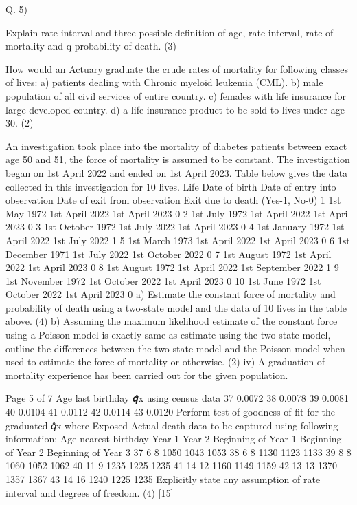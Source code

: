 Q. 5)
\item Explain rate interval and three possible definition of age, rate interval, \mu  rate of mortality and q probability of death.
(3)
\item How would an Actuary graduate the crude rates of mortality for following classes of lives:
a) patients dealing with Chronic myeloid leukemia (CML).
b) male population of all civil services of entire country.
c) females with life insurance for large developed country.
d) a life insurance product to be sold to lives under age 30.
(2)
\item An investigation took place into the mortality of diabetes patients between exact age 50 and 51, the force of mortality  is assumed to be constant.
The investigation began on 1st April 2022 and ended on 1st April 2023. Table below gives the data collected in this investigation for 10 lives.
Life
Date of birth
Date of entry into observation
Date of exit from observation
Exit due to death (Yes-1, No-0)
1
1st May 1972
1st April 2022
1st April 2023
0
2
1st July 1972
1st April 2022
1st April 2023
0
3
1st October 1972
1st July 2022
1st April 2023
0
4
1st January 1972
1st April 2022
1st July 2022
1
5
1st March 1973
1st April 2022
1st April 2023
0
6
1st December 1971
1st July 2022
1st October 2022
0
7
1st August 1972
1st April 2022
1st April 2023
0
8
1st August 1972
1st April 2022
1st September 2022
1
9
1st November 1972
1st October 2022
1st April 2023
0
10
1st June 1972
1st October 2022
1st April 2023
0
a) Estimate the constant force of mortality and probability of death using a two-state model and the data of 10 lives in the table above.
(4)
b) Assuming the maximum likelihood estimate of the constant force using a Poisson model is exactly same as estimate using the two-state model, outline the differences between the two-state model and the Poisson model when used to estimate the force of mortality or otherwise.
(2)
iv) A graduation of mortality experience has been carried out for the given population.

Page 5 of 7
Age last birthday
𝒒̂x using census data
37
0.0072
38
0.0078
39
0.0081
40
0.0104
41
0.0112
42
0.0114
43
0.0120
Perform test of goodness of fit for the graduated 𝑞̂x where Exposed Actual death data to be captured using following information:
Age nearest birthday
Year 1
Year 2
Beginning of Year 1
Beginning of Year 2
Beginning of Year 3
37
6
8
1050
1043
1053
38
6
8
1130
1123
1133
39
8
8
1060
1052
1062
40
11
9
1235
1225
1235
41
14
12
1160
1149
1159
42
13
13
1370
1357
1367
43
14
16
1240
1225
1235
Explicitly state any assumption of rate interval and degrees of freedom.
(4)
[15]




